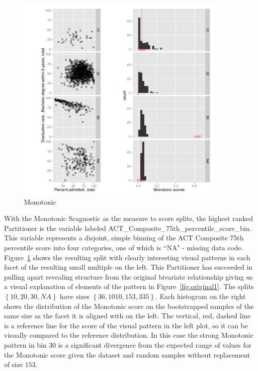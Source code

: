 \begin{figure}
\includegraphics[width=4in,height=4in]{images/15_8918450338241-ACT_Composite_75th_percentile_score_bin.pdf}
  \caption{Monotonic}
 \label{fig:monotonic1}
\end{figure}

With the Monotonic Scagnostic as the measure to score splits, the highest ranked Partitioner is the variable labeled ACT\_Composite\_75th\_percentile\_score\_bin. This variable represents a disjoint, simple binning of the ACT Composite 75th percentile score into four categories, one of which is ``NA" - missing data code. Figure~\ref{fig:monotonic1} shows the resulting split with clearly interesting visual patterns in each facet of the resulting small multiple on the left. This Partitioner has succeeded in pulling apart revealing structure from the original bivariate relationship giving us a visual explanation of elements of the pattern in Figure~\ref{fig:original1}. 
The splits $\left\{{10, 20, 30, NA}\right\}$ have sizes $\left\{{36, 1010, 153, 335}\right\}$. Each histogram on the right shows the distribution of the Monotonic score on the bootstrapped samples of the same size as the facet it is aligned with on the left. The vertical, red, dashed line is a reference line for the score of the visual pattern in the left plot, so it can be visually compared to the reference distribution. In this case the strong Monotonic pattern in bin $30$ is a significant divergence from the expected range of values for the Monotonic score given the dataset and random samples without replacement of size $153$.

